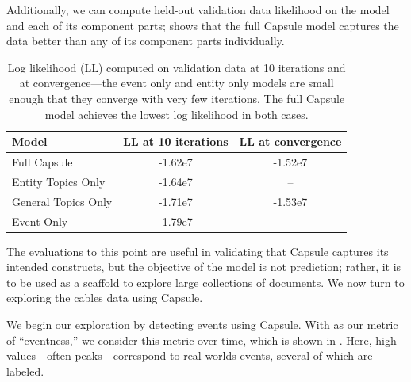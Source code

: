 Additionally, we can compute held-out validation data likelihood on the model and each of its component parts;  shows that the full Capsule model captures the data better than any of its component parts individually.
\begin{table}[bt]
\centering
\begin{tabular}{l c c}
\toprule
\textbf{Model} & \textbf{LL at 10 iterations} & \textbf{LL at convergence} \\
\midrule
Full Capsule & -1.62e7 & -1.52e7 \\
Entity Topics Only & -1.64e7 & -- \\
General Topics Only & -1.71e7 & -1.53e7 \\
Event Only & -1.79e7 & -- \\
\bottomrule
\end{tabular}
\caption{Log likelihood (LL) computed on validation data at 10 iterations and at convergence---the event only and entity only models are small enough that they converge with very few iterations. The full Capsule model achieves the lowest log likelihood in both cases.}
\label{table:cables:ll}
\end{table}

The evaluations to this point are useful in validating that Capsule captures its intended constructs, but the objective of the model is not prediction; rather, it is to be used as a scaffold to explore large collections of documents.  We now turn to exploring the cables data using Capsule.

We begin our exploration by detecting events using Capsule.  With  as our metric of ``eventness,'' we consider this metric over time, which is shown in .  Here, high values---often peaks---correspond to real-worlds events, several of which are labeled.

